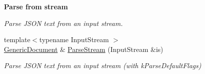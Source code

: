 \begin{Indent}{\bf Parse from stream}
\begin{DoxyCompactItemize}
\begin{DoxyCompactList}\small\item\em Parse J\+S\+ON text from an input stream. \end{DoxyCompactList}\item 
{\footnotesize template$<$typename Input\+Stream $>$ }\\\hyperlink{class_generic_document}{Generic\+Document} \& \hyperlink{class_generic_document_abe07ededbe9aaceb0058e3d254892b71}{Parse\+Stream} (Input\+Stream \&is)
\begin{DoxyCompactList}\small\item\em Parse J\+S\+ON text from an input stream (with k\+Parse\+Default\+Flags) \end{DoxyCompactList}\end{DoxyCompactItemize}
\end{Indent}
